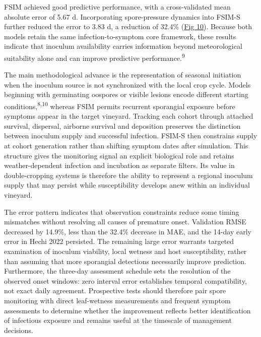\documentclass{article}
\begin{document}
FSIM achieved good predictive performance, with a cross-validated mean
absolute error of 5.67 d. Incorporating spore-pressure dynamics into FSIM-S
further reduced the error to 3.83 d, a reduction of 32.4\%
(\hyperref[fig:fsim-error-metrics]{Fig 10}). Because both models retain the
same infection-to-symptom core framework, these results indicate that
inoculum availability carries information beyond meteorological suitability
alone and can improve predictive performance.\textsuperscript{9}

The main methodological advance is the representation of seasonal
initiation when the inoculum source is not synchronized with the local
crop cycle. Models beginning with germinating oospores or visible lesions
encode different starting conditions,\textsuperscript{8,10} whereas FSIM
permits recurrent sporangial exposure before symptoms appear in the
target vineyard. Tracking each cohort through attached survival,
dispersal, airborne survival and deposition preserves the distinction
between inoculum supply and successful infection. FSIM-S then constrains
supply at cohort generation rather than shifting symptom dates after
simulation. This structure gives the monitoring signal an explicit
biological role and retains weather-dependent infection and incubation
as separate filters. Its value in double-cropping systems is therefore
the ability to represent a regional inoculum supply that may persist
while susceptibility develops anew within an individual vineyard.

The error pattern indicates that observation constraints reduce some
timing mismatches without resolving all causes of premature onset.
Validation RMSE decreased by 14.9\%, less than the 32.4\% decrease in MAE,
and the 14-day early error in Hechi 2022 persisted. The remaining large
error warrants targeted examination of inoculum viability, local wetness
and host susceptibility, rather than assuming that more sporangial
detections necessarily improve prediction. Furthermore, the three-day
assessment schedule sets the resolution of the observed onset windows:
zero interval error establishes temporal compatibility, not exact daily
agreement. Prospective tests should therefore pair spore monitoring with
direct leaf-wetness measurements and frequent symptom assessments to
determine whether the improvement reflects better identification of
infectious exposure and remains useful at the timescale of management
decisions.
\end{document}
